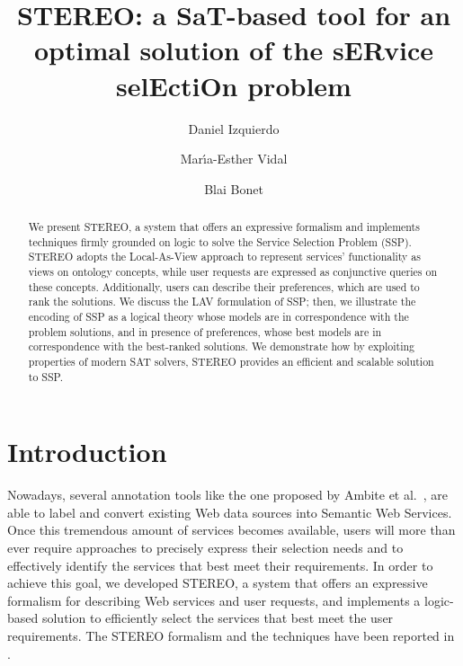 \documentclass{llncs}
\begin{document}
\allowdisplaybreaks
\title{STEREO: a SaT-based tool for an optimal solution of the sERvice selEctiOn problem}
\author{Daniel Izquierdo \and Mar\'{\i}a-Esther Vidal \and Blai Bonet}
\maketitle

\begin{abstract}
We present STEREO, a system that offers an expressive formalism and implements techniques firmly grounded on logic to solve the Service Selection Problem (SSP).
STEREO adopts the Local-As-View approach to represent services' functionality as 
views on ontology concepts, while user requests are expressed as conjunctive queries on these concepts. Additionally,  users can describe their preferences, which  are  used to rank the solutions. 
We discuss the LAV formulation  of SSP; then, we illustrate the encoding of SSP  as a logical theory  whose models are in correspondence with the problem solutions, and in presence of preferences, whose best models are in correspondence with the best-ranked solutions.  We demonstrate how by exploiting properties of  modern SAT solvers, STEREO provides an efficient and scalable solution  to  SSP. 
\end{abstract}

\section{Introduction}
Nowadays, several annotation tools like the one proposed by Ambite et al.\ \cite{AmbiteISWC09}, are able to label and convert existing Web data sources into Semantic Web Services.
Once this tremendous amount of services becomes available, users
will more than ever require approaches to precisely express their selection needs and to effectively identify the services that best meet their requirements.
In order to achieve this goal, we developed  STEREO, a system that offers an expressive formalism for describing Web services and user requests,  and implements a logic-based solution to efficiently select the services that best meet the user requirements. The STEREO formalism and the techniques have been reported in  \cite{IVB2010}.
 
\end{document}
